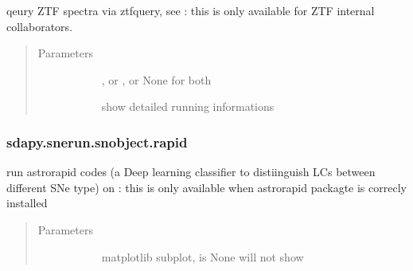 \documentclass[letterpaper,10pt,english]{sphinxmanual}
\begin{document}
\begin{fulllineitems}
\begin{fulllineitems}
\label{\detokenize{generated/sdapy.snerun.snobject.query_spectra:sdapy.snerun.snobject.query_spectra}}
qeury ZTF spectra via ztfquery,
see 
: this is only available for ZTF internal collaborators.
\begin{quote}\begin{description}
\item[{Parameters}] \leavevmode\begin{description}
\item[{}] \leavevmode{[}\sphinxtitleref{str}{]}
, or , or None for both

\item[{}] \leavevmode{[}\sphinxtitleref{bool}{]}
show detailed running informations

\end{description}

\end{description}\end{quote}

\end{fulllineitems}



\subsubsection{sdapy.snerun.snobject.rapid}
\label{\detokenize{generated/sdapy.snerun.snobject.rapid:sdapy-snerun-snobject-rapid}}\label{\detokenize{generated/sdapy.snerun.snobject.rapid::doc}}

\begin{fulllineitems}
\label{\detokenize{generated/sdapy.snerun.snobject.rapid:sdapy.snerun.snobject.rapid}}
run astrorapid codes (a Deep learning classifier to distiinguish LCs between different SNe type) on   
: this is only available when astrorapid packagte is correcly installed
\begin{quote}\begin{description}
\item[{Parameters}] \leavevmode\begin{description}
\item[{}] \leavevmode{[}\sphinxtitleref{matplotlib.axes}{]}
matplotlib subplot, is None will not show


\end{description}
\end{description}
\end{quote}
\end{fulllineitems}
\end{fulllineitems}
\end{document}
